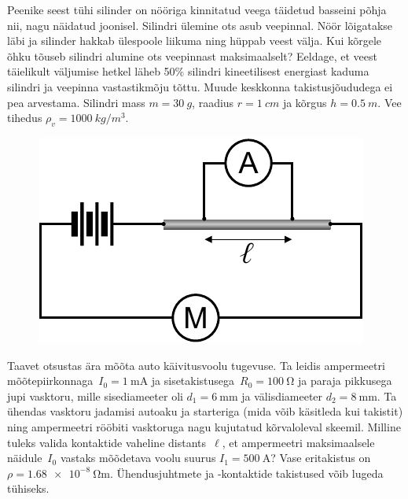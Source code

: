 \documentclass[10pt]{article}
\begin{document}
Peenike seest tühi silinder on nööriga kinnitatud veega täidetud basseini põhja nii, nagu näidatud joonisel. 
Silindri ülemine ots asub veepinnal. Nöör lõigatakse läbi ja silinder hakkab ülespoole liikuma ning hüppab veest välja. Kui kõrgele õhku tõuseb silindri alumine ots veepinnast maksimaalselt? Eeldage, et veest täielikult väljumise hetkel läheb 50\% silindri kineetilisest energiast kaduma silindri ja veepinna vastastikmõju tõttu. Muude keskkonna takistusjõududega ei pea arvestama.
Silindri mass $m = \SI{30}{g}$, raadius $r = \SI{1}{cm}$ ja kõrgus $h = \SI{0.5}{m}$. Vee tihedus $\rho_v=\SI{1000}{kg/m^3}$.
\probend
\bigskip

\setAuthor{}

\begin{figure}
  \vspace{-25pt}
  \begin{center}
  \includegraphics[scale=0.6]{2020-v3g-03-yl.pdf}
  \vspace{-20pt}
  \end{center}
\end{figure}
Taavet otsustas ära mõõta auto käivitusvoolu tugevuse. Ta leidis ampermeetri
mõõtepiirkonnaga~$I_0=\SI{1}{\milli\ampere}$ ja sisetakistusega~$R_0=\SI{100}{\ohm}$
ja paraja pikkusega jupi vasktoru, mille sisediameeter oli
$d_1=\SI{6}{\milli\meter}$ ja välisdiameeter $d_2=\SI{8}{\milli\meter}$. Ta ühendas
vasktoru jadamisi autoaku ja starteriga (mida võib käsitleda kui takistit) ning ampermeetri rööbiti
vasktoruga nagu kujutatud kõrvaloleval skeemil. Milline tuleks
valida kontaktide vaheline distants~$\ell$, et ampermeetri maksimaalsele
näidule~$I_0$ vastaks mõõdetava voolu suurus $I_1=\SI{500}{\ampere}$?
Vase eritakistus on $\rho=\SI{1.68e-8}{\ohm\meter}$. Ühendusjuhtmete ja
-kontaktide takistused võib lugeda tühiseks.
\probend
\bigskip
\end{document}
